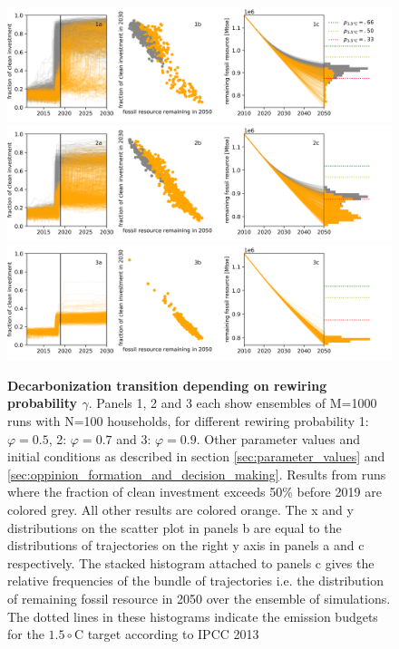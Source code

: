 \begin{figure}[H]
	\centering
        \includegraphics[width = 1.2 \textwidth]{figures/fitted_initials_evaluation05.png}
        \includegraphics[width = 1.2 \textwidth]{figures/fitted_initials_evaluation07.png}
        \includegraphics[width = 1.2 \textwidth]{figures/fitted_initials_evaluation09.png}
        \caption[Trajectory of decarbonization transition depending on the network rewiring rate in the social learning process]{\textbf{Decarbonization transition depending on rewiring probability $\gamma$}. Panels 1, 2 and 3 each show ensembles of M=1000 runs with N=100 households, for different rewiring probability 1: $\varphi=0.5$, 2: $\varphi=0.7$ and 3: $\varphi=0.9$. Other parameter values and initial conditions as described in section \ref{sec:parameter_values} and \ref{sec:oppinion_formation_and_decision_making}. Results from runs where the fraction of clean investment exceeds 50\% before 2019 are colored grey. All other results are colored orange. The x and y distributions on the scatter plot in panels b are equal to the distributions of trajectories on the right y axis in panels a and c respectively. The stacked histogram attached to panels c gives the relative frequencies of the bundle of trajectories i.e. the distribution of remaining fossil resource in 2050 over the ensemble of simulations. The dotted lines in these histograms indicate the emission budgets for the $1.5\circ$C target according to IPCC 2013}
        \label{fig:default_alpha_05}
\end{figure}



